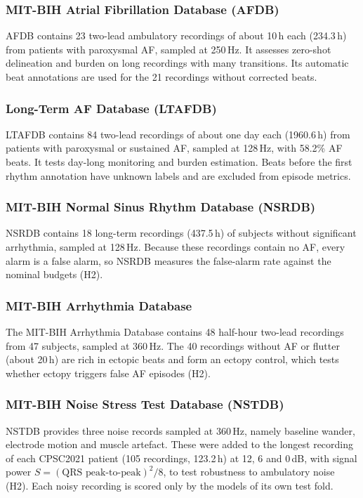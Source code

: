 \documentclass[preprint,12pt]{elsarticle}
\newcommand{\1}{\mathbf{1}}
\begin{document}
\subsubsection{MIT-BIH Atrial Fibrillation Database (AFDB)}
AFDB \cite{moody1983afdb} contains 23 two-lead ambulatory recordings of about 10\,h each (234.3\,h) from patients with paroxysmal AF, sampled at 250\,Hz. It assesses zero-shot delineation and burden on long recordings with many transitions. Its automatic beat annotations are used for the 21 recordings without corrected beats.

\subsubsection{Long-Term AF Database (LTAFDB)}
LTAFDB \cite{petrutiu2007ltafdb} contains 84 two-lead recordings of about one day each (1960.6\,h) from patients with paroxysmal or sustained AF, sampled at 128\,Hz, with 58.2\% AF beats. It tests day-long monitoring and burden estimation. Beats before the first rhythm annotation have unknown labels and are excluded from episode metrics.

\subsubsection{MIT-BIH Normal Sinus Rhythm Database (NSRDB)}
NSRDB contains 18 long-term recordings (437.5\,h) of subjects without significant arrhythmia, sampled at 128\,Hz. Because these recordings contain no AF, every alarm is a false alarm, so NSRDB measures the false-alarm rate against the nominal budgets (H2).

\subsubsection{MIT-BIH Arrhythmia Database}
The MIT-BIH Arrhythmia Database \cite{moody2001mitbih} contains 48 half-hour two-lead recordings from 47 subjects, sampled at 360\,Hz. The 40 recordings without AF or flutter (about 20\,h) are rich in ectopic beats and form an ectopy control, which tests whether ectopy triggers false AF episodes (H2).

\subsubsection{MIT-BIH Noise Stress Test Database (NSTDB)}
NSTDB \cite{moody1984nstdb} provides three noise records sampled at 360\,Hz, namely baseline wander, electrode motion and muscle artefact. These were added to the longest recording of each CPSC2021 patient (105 recordings, 123.2\,h) at 12, 6 and 0\,dB, with signal power $S=(\text{QRS peak-to-peak})^2/8$, to test robustness to ambulatory noise (H2). Each noisy recording is scored only by the models of its own test fold.
\end{document}
